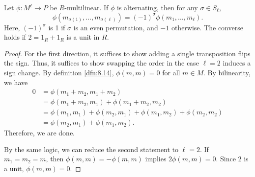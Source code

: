 \begin{lemma}\label{lma:8.6}
	Let $\phi : M^{\ell }  \to P$ be $R$-multilinear. If $\phi $ is alternating, then for any $\sigma \in S_\ell $, 
	\[
		\phi (m_{\sigma (1)} , \ldots ,m_{\sigma (\ell )} )=(-1)^{\sigma } \phi (m_1, \ldots, m_\ell )
	.\]
	Here, $(-1)^{\sigma }$ is 1 if $\sigma $ is an even permutation, and $-1$ otherwise. The converse holds if $2=1_R+1_R$ is a unit in $R$.
\end{lemma}
\begin{proof}
	For the first direction, it suffices to show adding a single transposition flips the sign. Thus, it suffices to show swapping the order in the case $\ell =2$ induces a sign change. By definition \ref{dfn:8.14}, $\phi (m,m)=0$ for all $m\in M$. By bilinearity, we have
	\begin{align*}
		0&=\phi (m_1+m_2,m_1+m_2)\\
		 &=\phi (m_1+m_2,m_1)+\phi (m_1+m_2,m_2)\\
		 &=\phi (m_1,m_1)+\phi (m_2,m_1)+\phi (m_1,m_2)+\phi (m_2,m_2)\\
		 &=\phi (m_2,m_1)+\phi (m_1,m_2)
	.\end{align*}
	Therefore, we are done.

	By the same logic, we can reduce the second statement to $\ell =2$. If $m_1=m_2=m$, then $\phi (m,m)=-\phi (m,m)$ implies $2\phi (m,m)=0$. Since $2$ is a unit, $\phi (m,m)=0$.
\end{proof}

